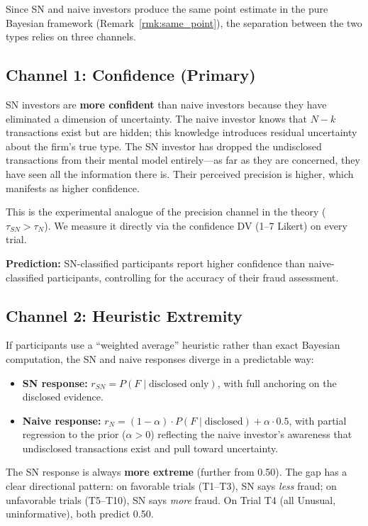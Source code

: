 \documentclass[12pt]{article}
\theoremstyle{definition}
\begin{document}
Since SN and naive investors produce the same point estimate in the pure Bayesian framework (Remark~\ref{rmk:same_point}), the separation between the two types relies on three channels.

\subsection{Channel 1: Confidence (Primary)}

SN investors are \textbf{more confident} than naive investors because they have eliminated a dimension of uncertainty. The naive investor knows that $N - k$ transactions exist but are hidden; this knowledge introduces residual uncertainty about the firm's true type. The SN investor has dropped the undisclosed transactions from their mental model entirely---as far as they are concerned, they have seen all the information there is. Their perceived precision is higher, which manifests as higher confidence.

This is the experimental analogue of the precision channel in the theory ($\tau_{SN} > \tau_N$). We measure it directly via the confidence DV (1--7 Likert) on every trial.

\textbf{Prediction:} SN-classified participants report higher confidence than naive-classified participants, controlling for the accuracy of their fraud assessment.

\subsection{Channel 2: Heuristic Extremity}

If participants use a ``weighted average'' heuristic rather than exact Bayesian computation, the SN and naive responses diverge in a predictable way:
\begin{itemize}[nosep]
\item \textbf{SN response:} $r_{SN} = P(F \mid \text{disclosed only})$, with full anchoring on the disclosed evidence.
\item \textbf{Naive response:} $r_{N} = (1 - \alpha) \cdot P(F \mid \text{disclosed}) + \alpha \cdot 0.5$, with partial regression to the prior ($\alpha > 0$) reflecting the naive investor's awareness that undisclosed transactions exist and pull toward uncertainty.
\end{itemize}

The SN response is always \textbf{more extreme} (further from 0.50). The gap has a clear directional pattern: on favorable trials (T1--T3), SN says \emph{less} fraud; on unfavorable trials (T5--T10), SN says \emph{more} fraud. On Trial T4 (all Unusual, uninformative), both predict 0.50.
\end{document}
